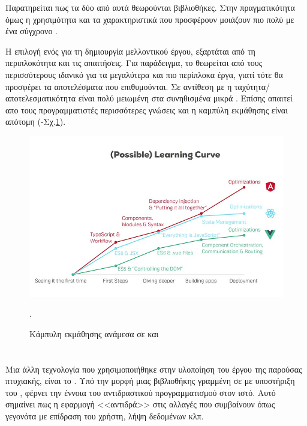 \quad Παρατηρείται πως τα δύο από αυτά θεωρούνται βιβλιοθήκες. Στην πραγματικότητα όμως η χρησιμότητα και τα χαρακτηριστικά που προσφέρουν μοιάζουν πιο πολύ με ένα σύγχρονο .\par
Η επιλογή ενός για τη δημιουργία μελλοντικού έργου, εξαρτάται από τη περιπλοκότητα και τις απαιτήσεις. Για παράδειγμα, το  θεωρείται από τους περισσότερους ιδανικό για τα μεγαλύτερα και πιο περίπλοκα έργα, γιατί τότε θα προσφέρει τα αποτελέσματα που επιθυμούνται. Σε αντίθεση με  η ταχύτητα/αποτελεσματικότητα είναι πολύ μειωμένη στα συνηθισμένα μικρά . Επίσης απαιτεί απο τους προγραμματιστές περισσότερες γνώσεις και η καμπύλη εκμάθησης είναι απότομη (-Σχ.\ref{fig:angular_vue_react_learning_curve}).
\begin{figure}[ht]
\centering
\includegraphics[scale=0.3]{images/angular-react-vue-learning-curve.jpg}
\caption{Κάμπυλη εκμάθησης ανάμεσα σε  και }.
\label{fig:angular_vue_react_learning_curve}
\end{figure}

\section{}
\quad Μια άλλη τεχνολογία που χρησιμοποιήθηκε στην υλοποίηση του έργου της παρούσας πτυχιακής, είναι το . Υπό την μορφή μιας βιβλιοθήκης γραμμένη σε  με υποστήριξη του , φέρνει την έννοια του αντιδραστικού προγραμματισμού στον ιστό. Αυτό σημαίνει πως η εφαρμογή <<αντιδρά>> στις αλλαγές που συμβαίνουν όπως γεγονότα με επίδραση του χρήστη, λήψη δεδομένων κλπ.

